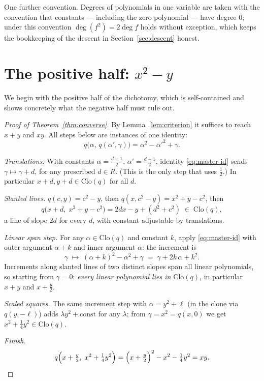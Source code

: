 \documentclass[11pt]{article}
\theoremstyle{definition}
\theoremstyle{remark}
\newcommand{\Clo}{\mathrm{Clo}}
\begin{document}
One further convention.  Degrees of polynomials in one variable are
taken with the convention that constants --- including the zero
polynomial --- have degree $0$; under this convention
$\deg(f^2) = 2\deg f$ holds without exception, which keeps the
bookkeeping of the descent in Section~\ref{sec:descent} honest.

\section{The positive half: $x^2 - y$}
\label{sec:converse}

We begin with the positive half of the dichotomy, which is
self-contained and shows concretely what the negative half must rule
out.

\begin{proof}[Proof of Theorem~\ref{thm:converse}]
By Lemma~\ref{lem:criterion} it suffices to reach $x+y$ and $xy$.
All steps below are instances of one identity:
\begin{equation}\label{eq:master-id}
  q\bigl(\alpha,\, q(\alpha', \gamma)\bigr)
  = \alpha^2 - \alpha'^2 + \gamma .
\end{equation}

\emph{Translations.}  With constants
$\alpha = \frac{d+1}{2}$, $\alpha' = \frac{d-1}{2}$,
identity \eqref{eq:master-id} sends $\gamma \mapsto \gamma + d$, for
any prescribed $d \in R$.  (This is the only step that uses
$\tfrac12$.)  In particular $x + d, y + d \in \Clo(q)$ for all $d$.

\emph{Slanted lines.}  $q(c, y) = c^2 - y$, then
$q(x, c^2 - y) = x^2 + y - c^2$, then
\[
  q\bigl(x + d,\; x^2 + y - c^2\bigr) = 2dx - y + (d^2 + c^2)
  \;\in\; \Clo(q),
\]
a line of slope $2d$ for every $d$, with constant adjustable by
translations.

\emph{Linear span step.}  For any $\alpha \in \Clo(q)$ and constant $k$,
apply \eqref{eq:master-id} with outer argument $\alpha + k$ and inner
argument $\alpha$: the increment is
\[
  \gamma \;\longmapsto\; (\alpha + k)^2 - \alpha^2 + \gamma
  \;=\; \gamma + 2k\,\alpha + k^2 .
\]
Increments along slanted lines of two distinct slopes span all linear
polynomials, so starting from $\gamma = 0$: \emph{every linear
polynomial lies in $\Clo(q)$}, in particular $x + y$ and
$x + \tfrac{y}{2}$.

\emph{Scaled squares.}  The same increment step with $\alpha = y^2 + \ell$
(in the clone via $q(y, -\ell)$) adds $\lambda y^2 + \text{const}$ for
any $\lambda$; from $\gamma = x^2 = q(x, 0)$ we get
$x^2 + \tfrac14 y^2 \in \Clo(q)$.

\emph{Finish.}
\[
  q\Bigl(x + \tfrac{y}{2},\; x^2 + \tfrac14 y^2\Bigr)
  = \Bigl(x + \tfrac{y}{2}\Bigr)^2 - x^2 - \tfrac14 y^2
  = xy . \qedhere
\]
\end{proof}
\end{document}
